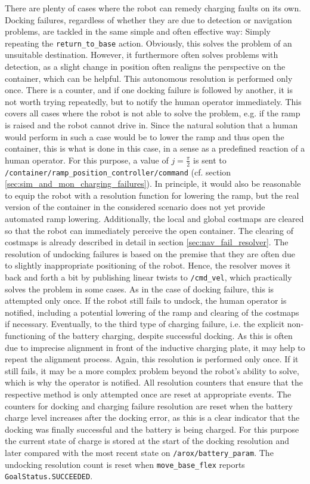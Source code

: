 \documentclass[english, master, utf8]{base/thesis_KBS}
\newcommand{\code}[1]{\colorbox{light-gray}{\texttt{#1}}}
\begin{document}
There are plenty of cases where the robot can remedy charging faults on its own. Docking failures, regardless of whether they are due to detection or navigation problems, are tackled
in the same simple and often effective way: Simply repeating the \code{return\_to\_base} action. Obviously, this solves the problem of an unsuitable destination. However, it
furthermore often solves problems with detection, as a slight change in position often realigns the perspective on the container, which can be helpful. This autonomous resolution is
performed only once. There is a counter, and if one docking failure is followed by another, it is not worth trying repeatedly, but to notify the human operator immediately. This
covers all cases where the robot is not able to solve the problem, e.g. if the ramp is raised and the robot cannot drive in. Since the natural solution that a human would perform in
such a case would be to lower the ramp and thus open the container, this is what is done in this case, in a sense as a predefined reaction of a human operator. For this purpose, a
value of $j = \frac{\pi}{2}$ is sent to \code{/container/ramp\_position\_controller/command} (cf. section \ref{sec:sim_and_mon_charging_failures}). In principle, it would also be
reasonable to equip the robot with a resolution function for lowering the ramp, but the real version of the container in the considered scenario does not yet provide automated ramp
lowering. Additionally, the local and global costmaps are cleared so that the robot can immediately perceive the open container. The clearing of costmaps is already described in
detail in section \ref{sec:nav_fail_resolver}. The resolution of undocking failures is based on the premise that they are often due to slightly inappropriate positioning of the robot.
Hence, the resolver moves it back and forth a bit by publishing linear twists to \code{/cmd\_vel}, which practically solves the problem in some cases. As in the case of docking
failure, this is attempted only once. If the robot still fails to undock, the human operator is notified, including a potential lowering of the ramp and clearing of the costmaps
if necessary. Eventually, to the third type of charging failure, i.e. the explicit non-functioning of the battery charging, despite successful docking. As this is often due to
imprecise alignment in front of the inductive charging plate, it may help to repeat the alignment process. Again, this resolution is performed only once. If it still fails, it
may be a more complex problem beyond the robot's ability to solve, which is why the operator is notified. All resolution counters that ensure that the respective method is only
attempted once are reset at appropriate events. The counters for docking and charging failure resolution are reset when the battery charge level increases after the docking
error, as this is a clear indicator that the docking was finally successful and the battery is being charged. For this purpose the current state of charge is stored at the start of
the docking resolution and later compared with the most recent state on \code{/arox/battery\_param}. The undocking resolution count is reset when \code{move\_base\_flex} reports
\code{GoalStatus.SUCCEEDED}.
\end{document}
